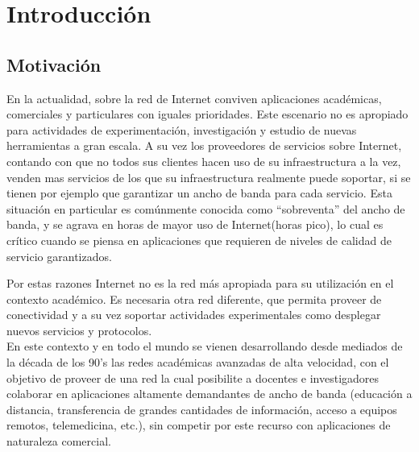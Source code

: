 
\chapter{Introducci\'on}

\ifpdf
    \graphicspath{{Chapter1/Figs/Raster/}{Chapter1/Figs/PDF/}{Chapter2/Figs/}}
\else
    \graphicspath{{Chapter1/Figs/Vector/}{Chapter1/Figs/}}
\fi


\section{Motivación}

En la actualidad, sobre la red de Internet conviven aplicaciones académicas, comerciales y particulares con iguales prioridades. Este escenario no es apropiado para actividades de experimentación, investigación y estudio de nuevas herramientas a gran escala. A su vez los proveedores de servicios sobre Internet, contando con que no todos sus clientes hacen uso de su infraestructura a la vez, venden mas servicios de los que su infraestructura realmente puede soportar, si se tienen por ejemplo que garantizar un ancho de banda para cada servicio. Esta situación en particular es comúnmente conocida como “sobreventa” del ancho de banda, y se agrava en horas de mayor uso de Internet(horas pico), lo cual es crítico cuando se piensa en aplicaciones que requieren de niveles de calidad de servicio garantizados.

Por estas razones Internet no es la red más apropiada para su utilización en el contexto académico. Es necesaria otra red diferente, que permita proveer de conectividad y a su vez soportar actividades experimentales como desplegar nuevos servicios y protocolos.\\ 

En este contexto y en todo el mundo se vienen desarrollando desde mediados de la década de los 90’s las redes académicas avanzadas de alta velocidad, con el objetivo de proveer de una red la cual posibilite a docentes e investigadores colaborar en aplicaciones altamente demandantes de ancho de banda (educación a distancia, transferencia de grandes cantidades de información, acceso a equipos remotos, telemedicina, etc.), sin competir por este recurso con aplicaciones de naturaleza comercial.

